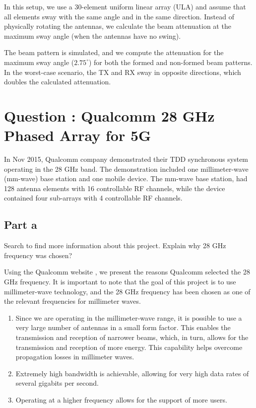 \documentclass[12pt,onecolumn,a4paper]{article}
\newcommand\question[1][\space]{
	\section[Question \numberstringnum{\thesection}]
	{Question \numberstringnum{\thesection}: #1}
}
\begin{document}
In this setup, we use a 30-element uniform linear array (ULA) and assume that all elements sway with the same angle and in the same direction. Instead of physically rotating the antennas, we calculate the beam attenuation at the maximum sway angle (when the antennas have no swing).

The beam pattern is simulated, and we compute the attenuation for the maximum sway angle (\(2.75^\circ\)) for both the formed and non-formed beam patterns. In the worst-case scenario, the TX and RX sway in opposite directions, which doubles the calculated attenuation.




\FloatBarrier\question[Qualcomm 28 GHz Phased Array for 5G]

{\color{questioncolor}
In Nov 2015, Qualcomm company demonstrated their TDD synchronous system operating in the 28 GHz band. The demonstration included one millimeter-wave (mm-wave) base station and one mobile device. The mm-wave base station, had 128 antenna elements with 16 controllable RF channels, while the device contained four sub-arrays with 4 controllable RF channels.\\

}


\subsection{Part a}

{\color{questioncolor}
Search to find more information about this project. Explain why 28 GHz frequency was chosen?\\
}

Using the Qualcomm website \cite{qualcommResearch}, we present the reasons Qualcomm selected the 28 GHz frequency. It is important to note that the goal of this project is to use millimeter-wave technology, and the 28 GHz frequency has been chosen as one of the relevant frequencies for millimeter waves.

\begin{enumerate}
	\item Since we are operating in the millimeter-wave range, it is possible to use a very large number of antennas in a small form factor. This enables the transmission and reception of narrower beams, which, in turn, allows for the transmission and reception of more energy. This capability helps overcome propagation losses in millimeter waves.
	\item Extremely high bandwidth is achievable, allowing for very high data rates of several gigabits per second.
	\item Operating at a higher frequency allows for the support of more users.
\end{enumerate}
\end{document}
